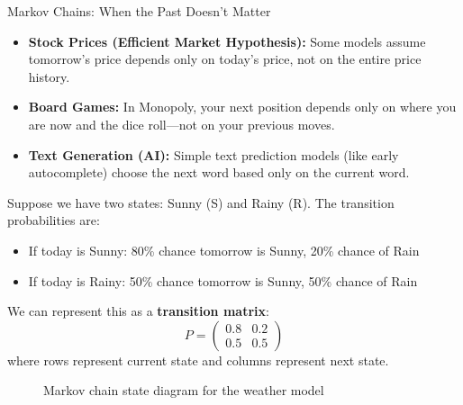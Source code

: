 \begin{itemize}
\begin{funfactsbreak}{Markov Chains: When the Past Doesn't Matter}
\begin{itemize}
    \item \textbf{Stock Prices (Efficient Market Hypothesis):} Some models assume tomorrow's price depends only on today's price, not on the entire price history.

    \item \textbf{Board Games:} In Monopoly, your next position depends only on where you are now and the dice roll—not on your previous moves.

    \item \textbf{Text Generation (AI):} Simple text prediction models (like early autocomplete) choose the next word based only on the current word.
\end{itemize}


Suppose we have two states: Sunny (S) and Rainy (R). The transition probabilities are:
\begin{itemize}
    \item If today is Sunny: 80\% chance tomorrow is Sunny, 20\% chance of Rain
    \item If today is Rainy: 50\% chance tomorrow is Sunny, 50\% chance of Rain
\end{itemize}

We can represent this as a \textbf{transition matrix}:
\[
P = \begin{pmatrix}
0.8 & 0.2 \\
0.5 & 0.5
\end{pmatrix}
\]
where rows represent current state and columns represent next state.

\begin{figure}[H]
    \centering
    \caption{Markov chain state diagram for the weather model}
    \label{fig:markov_weather}
\end{figure}



\end{funfactsbreak}
\end{itemize}
